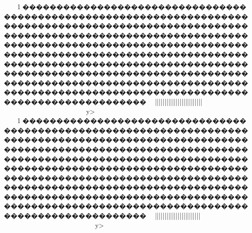 {{{{{{{{{{{{{{{{{{{{{{{{{{{{{{{{{{{{{{{{{{{{{{{{{{{{{{{{{{{{{{{{{{{{{{{{{{{{{{{{{{{{{{{{{{{{{{{{{{{{{{{{{{{{{{{{{{{{{{{{{{{{{{{{{{{{{{{{{{{{{{{{{{{{{{{{{{{{{{{{{{{{{{{{{{{{{{{{{{{{{{{{{{{{{{{{{{{{{{{{{{{{{{{{{{{{{{{{{{{{{{{{{{{{{{{{{{{{{{{{{{{{{{{{{{{{{{{{{{{{{{{{{{{{{{{{{{{{{{{{{{{{{{{{{{{{{{{{{{{{{{{{{{{{{{{{{{{{{{{{{{{{{{{{{{{{{{{{{{{{{{{{{{{{{{{{{{{{{{{{{{{{{{{{{{{{{{{{{{{{{{{{{{{{{{{{{{{{{{{{{{{{{{{{{{{{{{{{{{{{{{{{{{{{{{{{{{{{{{{{{{{{{{{{{{{{{{{{{{{{{{{{{{{{{{{{{{{{{{{{{{{{{{{{{{{{{{{{{{{{{{{{{{{{{{{{{{{{{{{{{{{{{{{{{{{{{{{{{{{{{{{{{{{{{{{{{{{{{{{{{{{{{{{{{{{{{{{{{{{{{{{{{{{{{{{{{{{{{{{{{{{{{{{{{{{{{{{{{{{{{{{{{{{{{{{{{{{{{{{{{{{{{{{{{{{{{{{{{{{{{{{{{{{{{{{{{{{{{{{{{{{{{{{{{{{{{{{{{{{{{{{{{{{{{{{{{{{{{{{{{{{{{{{{{{{{{{{{{{{{{{{{{{{{{{{{{{{{{{{{{{{{{{{{{{{{{{{{{{{{{{{{{{{{{{{{{{{{{{{{{{{{{{{{{{{{{{{{{{{{{{{{{{{{{{{{{{{{{{{{{{{{{{{{{{{{{{{{{{{{{{{{{{{{{{{{{{{{{{{{{{{{{{{{{{{{{{{{{{{{{{{{{{{{{{{{{{{{{{{{{{{{{{{{{{{{{{{{{{{{{{{{{{{{{{{{{{{{{{{{{{{{{{{{{{{{{{{{{{{{{{{{{{{{{{{{{{1\ky������������������������������������������������������������������������������������������������������������������������������������������������������������������������������������������������������������������������������������������������������������������������������������������������������������������������������������������������������������������������������������������~~}}}}}}}}||||||||||||||||}}}}||||{{{{|||||}}}~~~~~~~~y>
1\ky������������������������������������������������������������������������������������������������������������������������������������������������������������������������������������������������������������������������������������������������������������������������������������������������������������������������������������������������������������������������������������������~~}}}}}}}}||||||||{|||||||}}}}||||{{{{|||||}}}~~~~~~~~~~~~~~y>
}}}}}}}}}}}}}}}}}}}}}}}}}}}}}}}}}}}}}}}}}}}}}}}}}}}}}}}}}}}}}}}}}}}}}}}}}}}}}}}}}}}}}}}}}}}}}}}}}}}}}}}}}}}}}}}}}}}}}}}}}}}}}}}}}}}}}}}}}}}}}}}}}}}}}}}}}}}}}}}}}}}}}}}}}}}}}}}}}}}}}}}}}}}}}}}}}}}}}}}}}}}}}}}}}}}}}}}}}}}}}}}}}}}}}}}}}}}}}}}}}}}}}}}}}}}}}}}}}}}}}}}}}}}}}}}}}}}}}}}}}}}}}}}}}}}}}}}}}}}}}}}}}}}}}}}}}}}}}}}}}}}}}}}}}}}}}}}}}}}}}}}}}}}}}}}}}}}}}}}}}}}}}}}}}}}}}}}}}}}}}}}}}}}}}}}}}}}}}}}}}}}}}}}}}}}}}}}}}}}}}}}}}}}}}}}}}}}}}}}}}}}}}}}}}}}}}}}}}}}}}}}}}}}}}}}}}}}}}}}}}}}}}}}}}}}}}}}}}}}}}}}}}}}}}}}}}}}}}}}}}}}}}}}}}}}}}}}}}}}}}}}}}}}}}}}}}}}}}}}}}}}}}}}}}}}}}}}}}}}}}}}}}}}}}}}}}}}}}}}}}}}}}}}}}}}}}}}}}}}}}}}}}}}}}}}}}}}}}}}}}}}}}}}}}}}}}}}}}}}}}}}}}}}}}}}}}}}}}}}}}}}}}}}}}}}}}}}}}}}}}}}}}}}}}}}}}}}}}}}}}}}}}}}}}}}}}}}}}}}}}}}}}}}}}}}}}}}}}}}}}}}}}}}}}}}}}}}}}}}}}}}}}}}}}}}}}}}}}}}}}}}}}}}}}}}}}}}}}}}}}}}}}}}}}}}}}}}}}}}}}}}}}}}}}}}}}}}}}}}}}}}}}}}}}}}}}}}}}}}}}}}}}}}}}}}}}}}}}}}}}}}}}}}}}}}}}}}}}}}}}}}}}}}}}}}}}}}}}}}}}}}}}}}}}}}}}}}}}}}}}}}}}}}}}}}}}
